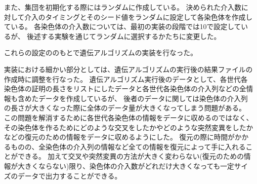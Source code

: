 また、集団を初期化する際にはランダムに作成している。
決められた介入数に対して介入のタイミングとそのシード値をランダムに設定して各染色体を作成している。
各染色体の介入数については、最初の実装の段階では10で設定しているが、
後述する実験を通じてランダムに選択するかたちに変更した。

これらの設定ののもとで遺伝アルゴリズムの実装を行なった。


実装における細かい部分としては、遺伝アルゴリズムの実行後の結果ファイルの作成時に調整を行なった。
遺伝アルゴリズム実行後のデータとして、各世代各染色体の証明の長さをリストにしたデータと各世代各染色体の介入列などの全情報も含めたデータを作成しているが、
後者のデータに関しては染色体の介入列の長さが大きくなった際に全体のデータ量が大きくなってしまう問題がある。
この問題を解消するために各世代各染色体の情報をデータに収めるのではなく、その染色体を作るためにどのような交叉をしたかやどのような突然変異をしたかなどの復元のための情報をデータに収めるようにした。
復元の際に時間がかかるものの、全染色体の介入列の情報など全ての情報を復元によって手に入れることができる。
加えて交叉や突然変異の方法が大きく変わらない(復元のための情報が大きくならない)限り、染色体の介入数がどれだけ大きくなっても一定サイズのデータで出力することができる。